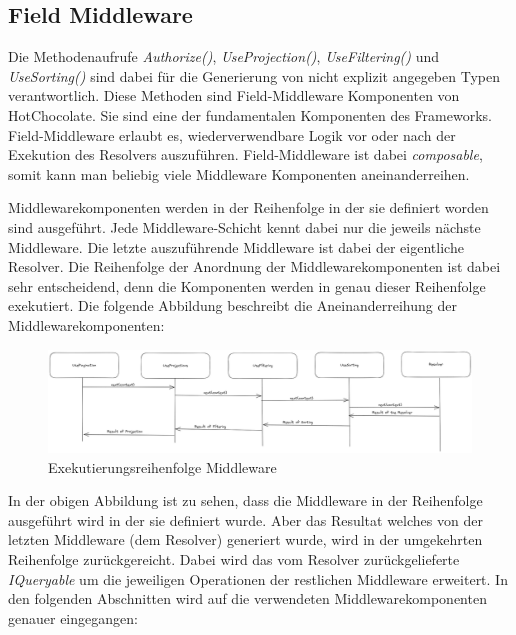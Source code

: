 \subsection{Field Middleware}
Die Methodenaufrufe \textit{Authorize()}, \textit{UseProjection()}, \textit{UseFiltering()} und \textit{UseSorting()} sind dabei für die Generierung von nicht explizit angegeben Typen verantwortlich.
Diese Methoden sind Field-Middleware Komponenten von HotChocolate.
Sie sind eine der fundamentalen Komponenten des Frameworks.
Field-Middleware erlaubt es, wiederverwendbare Logik vor oder nach der Exekution des Resolvers auszuführen.
Field-Middleware ist dabei \textit{composable}, somit kann man beliebig viele Middleware Komponenten aneinanderreihen.

Middlewarekomponenten werden in der Reihenfolge in der sie definiert worden sind ausgeführt.
Jede Middleware-Schicht kennt dabei nur die jeweils nächste Middleware.
Die letzte auszuführende Middleware ist dabei der eigentliche Resolver.
Die Reihenfolge der Anordnung der Middlewarekomponenten ist dabei sehr entscheidend, denn die Komponenten werden in genau dieser Reihenfolge exekutiert.
Die folgende Abbildung beschreibt die Aneinanderreihung der Middlewarekomponenten:

\begin{figure}[H]
    \includegraphics[width=\textwidth]{pics/middleware.png}
    \caption{Exekutierungsreihenfolge Middleware}
\end{figure}

In der obigen Abbildung ist zu sehen, dass die Middleware in der Reihenfolge ausgeführt wird in der sie definiert wurde.
Aber das Resultat welches von der letzten Middleware (dem Resolver) generiert wurde, wird in der umgekehrten Reihenfolge zurückgereicht.
Dabei wird das vom Resolver zurückgelieferte \textit{IQueryable} um die jeweiligen Operationen der restlichen Middleware erweitert.
In den folgenden Abschnitten wird auf die verwendeten Middlewarekomponenten genauer eingegangen: 

